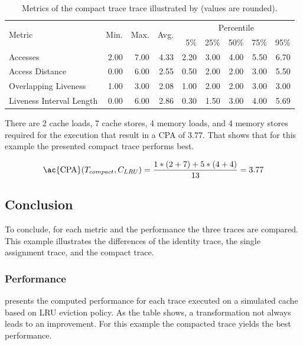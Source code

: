 \documentclass[onecolumn, openright, master, english, signatures]{dbrgrptt}
\begin{document}
\begin{table}[!ht]
  \centering
  \begin{tabular}{lrrrrrrrr}
    \hline
    \multirow{2}{*}{Metric} & \multirow{2}{*}{Min.} & \multirow{2}{*}{Max.} & \multirow{2}{*}{Avg.} & \multicolumn{5}{c}{Percentile} \tabularnewline
    & & & & 5\% & 25\% & 50\% & 75\% & 95\% \tabularnewline
    \hline
    Accesses                 & 2.00 & 7.00 & 4.33 & 2.20 & 3.00 & 4.00 & 5.50 & 6.70 \\
    Access Distance          & 0.00 & 6.00 & 2.55 & 0.50 & 2.00 & 2.00 & 3.00 & 5.50 \\
    Overlapping Liveness     & 1.00 & 3.00 & 2.08 & 1.00 & 2.00 & 2.00 & 3.00 & 3.00 \\
    Liveness Interval Length & 0.00 & 6.00 & 2.86 & 0.30 & 1.50 & 3.00 & 4.00 & 5.69 \\
    \hline
  \end{tabular}
  \caption{Metrics of the compact trace \ac{trace} illustrated by  (values are rounded).}
  \label{tab:summarizing-example-metrics-compact}
\end{table}

There are 2 cache loads, 7 cache stores, 4 memory loads, and 4 memory stores required for the execution that result in a \ac{CPA} of $3.77$.
That shows that for this example the presented compact trace performs best.

\begin{equation}\label{equ:trace-transformation-compact-marked}
\text{\ac{CPA}}(T_{compact}, C_{LRU}) = \frac{1 * (2 + 7) + 5 * (4 + 4)}{13} = 3.77
\end{equation}

\subsection{Conclusion}
To conclude, for each metric and the performance the three \ac{trace}s are compared. This example illustrates the differences of the identity \ac{trace}, the single assignment \ac{trace}, and the compact \ac{trace}.

\subsubsection{Performance}
 presents the computed performance for each \ac{trace} executed on a simulated cache based on \ac{LRU} eviction policy.
As the table shows, a transformation not always leads to an improvement.
For this example the compacted \ac{trace} yields the best performance.
\end{document}

